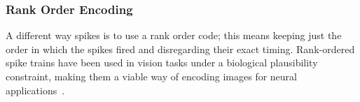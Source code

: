 \subsubsection{Rank Order Encoding}
A different way \DIFdelbegin {}\DIFdelend \DIFaddbegin {}\DIFaddend spikes is to use a rank order code; this means
keeping just the order in which the spikes fired and disregarding their exact timing.
Rank-ordered spike trains have been used in vision tasks under a biological plausibility constraint, making them a viable way of encoding images for neural applications~\citep{van2001rate,sen2009evaluating,masmoudi2010novel}.
%
%		
%		
%		
